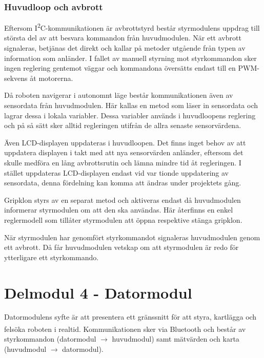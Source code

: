 \documentclass[11pt]{article}
\begin{document}
\begin{flushleft}


\subsubsection{Huvudloop och avbrott}
Eftersom I\textsuperscript{2}C-kommunikationen är avbrottstyrd består styrmodulens uppdrag till största del av att besvara kommandon från huvudmodulen. När ett avbrott signaleras, betjänas det direkt och kallar på metoder utgående från typen av information som anländer. I fallet av manuell styrning mot styrkommandon sker ingen reglering gentemot väggar och kommandona översätts endast till en PWM-sekvens åt motorerna.

Då roboten navigerar i autonomnt läge består kommunikationen även av sensordata från huvudmodulen. Här kallas en metod som läser in sensordata och lagrar dessa i lokala variabler. Dessa variabler används i huvudloopens reglering och på så sätt sker alltid regleringen utifrån de allra senaste sensorvärdena. 

Även LCD-displayen uppdateras i huvudloopen. Det finns inget behov av att uppdatera displayen i takt med att nya sensorvärden anländer, eftersom det skulle medföra en lång avbrottsrutin och lämna mindre tid åt regleringen. I stället uppdateras LCD-displayen endast vid var tionde uppdatering av sensordata, denna fördelning kan komma att ändras under projektets gång. 

Gripklon styrs av en separat metod och aktiveras endast då huvudmodulen informerar styrmodulen om att den ska användas. Här återfinns en enkel reglermodell som tillåter styrmodulen att öppna respektive stänga gripklon. 

När styrmodulen har genomfört styrkommandot signaleras huvudmodulen genom ett avbrott. Då får huvudmodulen vetskap om att styrmodulen är redo för ytterligare ett styrkommando. 

\pagebreak
\section{Delmodul 4 - Datormodul}
Datormodulens syfte är att presentera ett gränssnitt för att styra, kartlägga och felsöka roboten i realtid. Kommunikationen sker via Bluetooth\textsuperscript{\circledR} och består av styrkommandon (datormodul $\rightarrow$ huvudmodul) samt mätvärden och karta (huvudmodul $\rightarrow$ datormodul). 


\end{flushleft}
\end{document}
